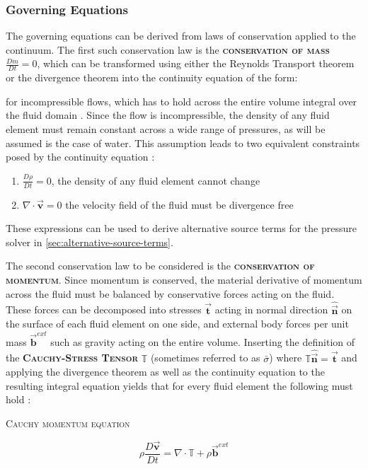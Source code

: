 \documentclass[oneside, a4paper]{book}
\newcommand\emphasis[1]{{\scshape\bfseries#1}}
\newcommand{\equationnamed}[2]{%
  \setlength{\fboxsep}{2pt} %
  \setlength{\fboxrule}{0.01pt}
  \begin{center}
    \begin{minipage}{\textwidth}
      \begin{center}\textsc{#1}\end{center}
      #2
    \end{minipage}
  \end{center}
}
\newcommand{\equationnamedbox}[2]{%
  \setlength{\fboxsep}{5pt} %
  \setlength{\fboxrule}{0.01pt}
  \begin{center}
    \fbox{
      \begin{minipage}{0.4\textwidth}
        \begin{center}\emphasis{#1}\end{center}
        #2
      \end{minipage}
    }
  \end{center}
}
\newcommand\vek[1]{\vec{\bm{#1}}}
\newcommand\mat[1]{{\mathds{#1}}}
\newcommand\br[1]{\left(#1\right)}
\newcommand\divergence{{\nabla\cdot}}
\begin{document}
    \subsubsection{Governing Equations}
    The governing equations can be derived from laws of conservation applied to the continuum. The first such conservation law is the \emphasis{conservation of mass} $\frac{Dm}{Dt}=0$, which can be transformed using either the Reynolds Transport theorem or the divergence theorem \autocite{labcourse} into the continuity equation of the form:
    \equationnamedbox{Continuity Equation}{
      \begin{equation}\label{eq:continuity}
        \frac{D\rho}{Dt} +\rho\br{\divergence \vek{v}} = 0
      \end{equation}
    }
    for incompressible flows, which has to hold across the entire volume integral over the fluid domain \autocite{anderson}. Since the flow is incompressible, the density of any fluid element must remain constant across a wide range of pressures, as will be assumed is the case of water. This assumption leads to two equivalent constraints posed by the continuity equation \autocite{continuum-intro}: 
    \begin{enumerate}
      \item $\frac{D\rho}{Dt}=0$, the density of any fluid element cannot change \label{enum:continuity-equation-constraint-den}
      \item $\divergence\vek{v}=0$ the velocity field of the fluid must be divergence free \label{enum:continuity-equation-constraint-vel}
    \end{enumerate}
    These expressions can be used to derive alternative source terms for the pressure solver in \autoref{sec:alternative-source-terms}.


    The second conservation law to be considered is the \emphasis{conservation of momentum}. Since momentum is conserved, the material derivative of momentum across the fluid must be balanced by conservative forces acting on the fluid. These forces can be decomposed into stresses $\vek{t}$ acting in normal direction $\hat{\vek{n}}$ on the surface of each fluid element on one side, and external body forces per unit mass $\vek{b}^{ext}$ such as gravity acting on the entire volume. Inserting the definition of the \emphasis{Cauchy-Stress Tensor} $\mat{T}$ (sometimes referred to as $\bar\sigma$) where $\mat{T}\hat{\vek{n}}=\vek{t}$ and applying the divergence theorem as well as the continuity equation to the resulting integral equation yields that for every fluid element the following must hold \autocite{continuum-intro}:
    \equationnamed{Cauchy momentum equation}{
      \begin{equation}
        \rho\frac{D\vek{v}}{Dt} = \divergence\mat{T} + \rho\vek{b}^{ext}
      \end{equation}
      }
\end{document}
